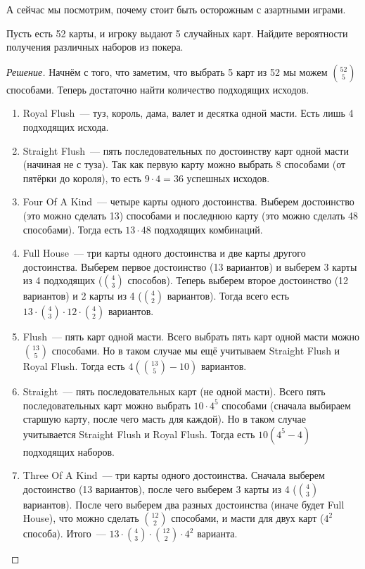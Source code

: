 А сейчас мы посмотрим, почему стоит быть осторожным с азартными играми.
\begin{problem}
    Пусть есть 52 карты, и игроку выдают 5 случайных карт. Найдите вероятности получения различных наборов из покера.
\end{problem}
\begin{proof}[Решение]
    Начнём с того, что заметим, что выбрать 5 карт из 52 мы можем \(\binom{52}{5}\) способами. Теперь достаточно найти количество подходящих исходов.
    \begin{enumerate}
        \item Royal Flush~--- туз, король, дама, валет и десятка одной масти. Есть лишь 4 подходящих исхода.
        \item Straight Flush~--- пять последовательных по достоинству карт одной масти (начиная не с туза). Так как первую карту можно выбрать 8 способами (от пятёрки до короля), то есть \(9 \cdot 4 = 36\) успешных исходов.
        \item Four Of A Kind~--- четыре карты одного достоинства. Выберем достоинство (это можно сделать 13) способами и последнюю карту (это можно сделать 48 способами). Тогда есть \(13 \cdot 48\) подходящих комбинаций.
        \item Full House~--- три карты одного достоинства и две карты другого достоинства. Выберем первое достоинство (13 вариантов) и выберем 3 карты из 4 подходящих (\(\binom{4}{3}\) способов). Теперь выберем второе достоинство (12 вариантов) и 2 карты из 4 (\(\binom{4}{2}\) вариантов). Тогда всего есть \(13 \cdot \binom{4}{3} \cdot 12 \cdot \binom{4}{2}\) вариантов.
        \item Flush~--- пять карт одной масти. Всего выбрать пять карт одной масти можно \(\binom{13}{5}\) способами. Но в таком случае мы ещё учитываем Straight Flush и Royal Flush. Тогда есть \(4(\binom{13}{5} - 10)\) вариантов.
        \item Straight~--- пять последовательных карт (не одной масти). Всего пять последовательных карт можно выбрать \(10 \cdot 4^5\) способами (сначала выбираем старшую карту, после чего масть для каждой). Но в таком случае учитывается Straight Flush и Royal Flush. Тогда есть \(10(4^5 - 4)\) подходящих наборов.
        \item Three Of A Kind~--- три карты одного достоинства. Сначала выберем достоинство (13 вариантов), после чего выберем 3 карты из 4 (\(\binom{4}{3}\) вариантов). После чего выберем два разных достоинства (иначе будет Full House), что можно сделать \(\binom{12}{2}\) способами, и масти для двух карт (\(4^2\) способа). Итого~--- \(13 \cdot \binom{4}{3} \cdot \binom{12}{2} \cdot 4^2\) варианта.

\end{enumerate}
\end{proof}
